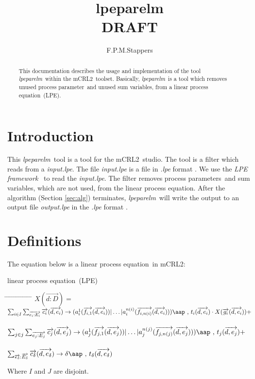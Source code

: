 \documentclass[a4paper,10pt]{article}
\title{lpeparelm\\DRAFT}
\author{F.P.M.Stappers}
\theoremstyle{plain}
\theoremstyle{definition}
\newcommand{\mcrl}{mCRL2}
\newcommand{\lpe}{linear process equation}
\newcommand{\tool}{\textit{lpeparelm}}
\newcommand{\ti}{\textit}
\newcommand{\ovr}{\overrightarrow}
\newcommand{\pp}{process parameter}
\newcommand{\pps}{process parameters}
\newcommand{\framework}{\textit{LPE framework} \cite{LPEframework}}
\newcommand{\tab}{\hspace*{5.mm} \= \hspace*{5.mm} \= \hspace*{5.mm} \= \hspace*{5.mm} \= \hspace*{5.mm} \= \hspace*{5.mm}  \= \hspace*{5.mm}  \= \hspace*{5.mm}  \= \hspace*{5.mm} \= \hspace*{5.mm} \= \hspace*{5.mm}  \= \hspace*{5.mm}  \= \hspace*{5.mm}\kill}
\newcommand{\at}[1]{\mbox{\aap ,} #1}
\begin{document}
\maketitle

\begin{abstract}
This documentation describes the usage and implementation of the tool \tool\ within the \mcrl\ toolset.
Basically, \tool\ is a tool which removes unused \pp\ and unused sum variables, from a \lpe\ (LPE).
\end{abstract}

\tableofcontents

\section{Introduction}
This \tool\ tool is a tool for the \mcrl\ studio. The tool is a
filter which reads from a \ti{input.lpe}. The file \ti{input.lpe} is
a file in \ti{.lpe} format \cite{LPEformat}. We use the
\framework\ to read the \ti{input.lpe}. The filter removes \pps\ and sum variables, which are not used, from the
\lpe . After the algorithm (Section \ref{sec:alg}) terminates, \tool\
will write the output to an output file \ti{output.lpe} in the \ti{.lpe} format \cite{LPEformat}.

\section{Definitions} \label{sec:def}

The equation below is a \lpe\ in \mcrl : 
\begin{defn}\lpe\ (LPE) \newline
\begin{tabbing}
\tab
$X (\ovr{d: D}) = $ \> \> \> $ \sum_{i \in I} \sum_{\ovr{e_i: E_i}} \ovr{c_i} ( \ovr{d, e_i }) \rightarrow 
(a_i^1 (\ovr{f_{i,1}}(\ovr{d,e_i})) \vert \ldots \vert a_i^{n(i)}(\ovr{f_{i,n(i)}}(\ovr{d,e_i}))) \at \text{ } t_i(\ovr{d,e_i})  \cdot X(\ovr{g_i}(\ovr{d,e_i})) +$ \\ \\
\> \> \> $ \sum_{j \in j} \sum_{\ovr{e_j: E_j}} \ovr{c_j} ( \ovr{d, e_j} ) \rightarrow 
(a_j^1 (\ovr{f_{j,1}}(\ovr{d,e_j})) \vert \ldots \vert a_j^{n(j)}(\ovr{f_{j,n(j)}}(\ovr{d,e_j}))) \at \text{ } t_j(\ovr{d,e_j}) + $ \\ \\
\> \> \> $\sum_{\ovr{e_\delta}:\ovr{E_\delta}} \ovr{c_\delta} ( \ovr{d, e_\delta}) \rightarrow 
\delta \at \text{ } t_\delta(\ovr{d,e_\delta})$ 
\end{tabbing}

Where $I$ and $J$ are disjoint.\\
\end{defn}
\end{document}
